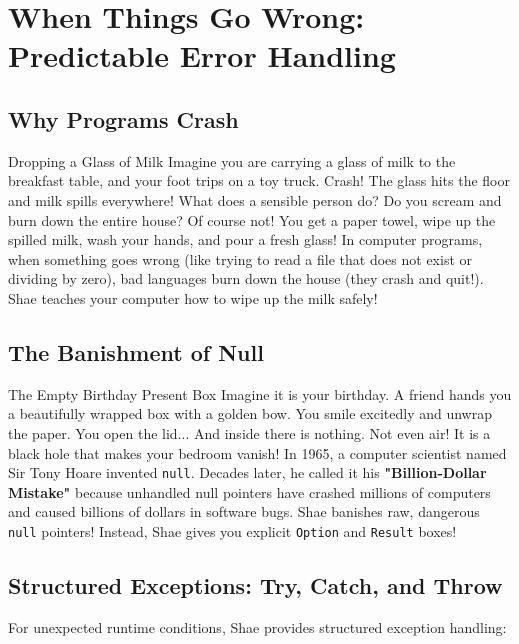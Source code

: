 \chapter{When Things Go Wrong: Predictable Error Handling}

\section{Why Programs Crash}

\begin{kidbox}{Dropping a Glass of Milk}
Imagine you are carrying a glass of milk to the breakfast table, and your foot trips on a toy truck.
Crash! The glass hits the floor and milk spills everywhere!
What does a sensible person do?
Do you scream and burn down the entire house? Of course not!
You get a paper towel, wipe up the spilled milk, wash your hands, and pour a fresh glass!
In computer programs, when something goes wrong (like trying to read a file that does not exist or dividing by zero), bad languages burn down the house (they crash and quit!).
Shae teaches your computer how to wipe up the milk safely!
\end{kidbox}

\section{The Banishment of Null}

\begin{kidbox}{The Empty Birthday Present Box}
Imagine it is your birthday. A friend hands you a beautifully wrapped box with a golden bow.
You smile excitedly and unwrap the paper. You open the lid...
And inside there is nothing. Not even air! It is a black hole that makes your bedroom vanish!
In 1965, a computer scientist named Sir Tony Hoare invented \texttt{null}. Decades later, he called it his \textbf{"Billion-Dollar Mistake"} because unhandled null pointers have crashed millions of computers and caused billions of dollars in software bugs.
Shae banishes raw, dangerous \texttt{null} pointers! Instead, Shae gives you explicit \texttt{Option} and \texttt{Result} boxes!
\end{kidbox}

\section{Structured Exceptions: Try, Catch, and Throw}

For unexpected runtime conditions, Shae provides structured exception handling:

